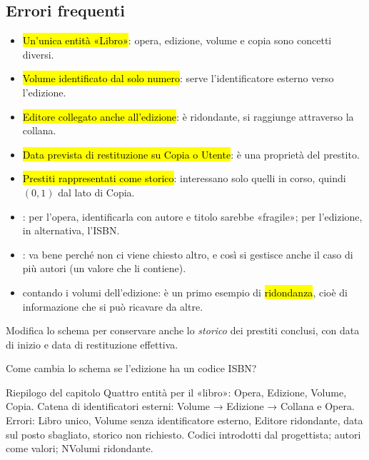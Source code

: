 \subsection{Errori frequenti}

\begin{attenzione}
\begin{itemize}
  \item \hl{Un'unica entità «Libro»}: opera, edizione, volume e copia sono concetti diversi.
  \item \hl{Volume identificato dal solo numero}: serve l'identificatore esterno verso l'edizione.
  \item \hl{Editore collegato anche all'edizione}: è ridondante, si raggiunge attraverso la collana.
  \item \hl{Data prevista di restituzione su Copia o Utente}: è una proprietà del prestito.
  \item \hl{Prestiti rappresentati come storico}: interessano solo quelli in corso, quindi $(0,1)$ dal lato di Copia.
\end{itemize}
\end{attenzione}

\begin{mlbox}
\begin{itemize}
  \item {}: per l'opera, identificarla con autore e titolo sarebbe «fragile»; per l'edizione, in alternativa, l'ISBN.
  \item {}: va bene perché non ci viene chiesto altro, e così si gestisce anche il caso di più autori (un valore che li contiene).
  \item {} contando i volumi dell'edizione: è un primo esempio di \hl{ridondanza}, cioè di informazione che si può ricavare da altre.
\end{itemize}
\end{mlbox}

\begin{esercizi}
\begin{passi}
  \item Modifica lo schema per conservare anche lo \emph{storico} dei prestiti conclusi, con data di inizio e data di restituzione effettiva.
  \item Come cambia lo schema se l'edizione ha un codice ISBN?
\end{passi}
\end{esercizi}

\begin{appunti}{Riepilogo del capitolo}
 Quattro entità per il «libro»: Opera, Edizione, Volume, Copia.
 Catena di identificatori esterni: Volume → Edizione → Collana e Opera.
 Errori: Libro unico, Volume senza identificatore esterno, Editore ridondante, data sul posto sbagliato, storico non richiesto.
 Codici introdotti dal progettista; autori come valori; NVolumi ridondante.
\end{appunti}
